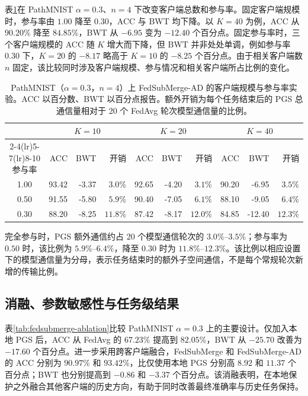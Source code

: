 表\ref{tab:fedsubmerge-scalability}在 PathMNIST $\alpha=0.3$、$n=4$ 下改变客户端总数和参与率。固定客户端规模时，参与率由 $1.00$ 降至 $0.30$，ACC 与 BWT 均下降。以 $K=40$ 为例，ACC 从 $90.20\%$ 降至 $84.85\%$，BWT 从 $-6.95$ 变为 $-12.40$ 个百分点。固定参与率时，三个客户端规模的 ACC 随 $K$ 增大而下降，但 BWT 并非处处单调，例如参与率 $0.30$ 下，$K=20$ 的 $-8.17$ 略高于 $K=10$ 的 $-8.25$ 个百分点。由于相关客户端数 $n$ 固定，该比较同时涉及客户端规模、参与情况和相关客户端所占比例的变化。

\begin{table}[htbp]
\centering
\caption{PathMNIST（$\alpha=0.3$，$n=4$）上 FedSubMerge-AD 的客户端规模与参与率实验。ACC 以百分数、BWT 以百分点报告。额外开销为每个任务结束后的 PGS 总通信量相对于 20 个 FedAvg 轮次模型通信量的比例。}
\label{tab:fedsubmerge-scalability}
\thesistablefont
\setlength{\tabcolsep}{3pt}
\renewcommand{\arraystretch}{1.12}
\begin{tabular}{crrrrrrrrr}
\toprule
& \multicolumn{3}{c}{$K=10$} & \multicolumn{3}{c}{$K=20$} & \multicolumn{3}{c}{$K=40$} \\
\cmidrule(lr){2-4}\cmidrule(lr){5-7}\cmidrule(lr){8-10}
参与率 & ACC & BWT & 开销 & ACC & BWT & 开销 & ACC & BWT & 开销 \\
\midrule
1.00 & 93.42 & -3.37 & $3.0\%$ & 92.65 & -4.20 & $3.1\%$ & 90.20 & -6.95 & $3.5\%$ \\
0.50 & 91.55 & -5.80 & $5.9\%$ & 90.40 & -7.05 & $6.1\%$ & 88.10 & -9.05 & $6.4\%$ \\
0.30 & 88.20 & -8.25 & $11.8\%$ & 87.42 & -8.17 & $12.0\%$ & 84.85 & -12.40 & $12.3\%$ \\
\bottomrule
\end{tabular}%

\end{table}

完全参与时，PGS 额外通信约占 20 个模型通信轮次的 $3.0\%$--$3.5\%$；参与率为 $0.50$ 时，该比例为 $5.9\%$--$6.4\%$，降至 $0.30$ 时为 $11.8\%$--$12.3\%$。该比例以相应设置下的模型通信量为分母，表示任务结束时的额外子空间通信，不是每个常规轮次新增的传输比例。

\subsection{消融、参数敏感性与任务级结果}
\label{subsec:fedsubmerge-ablation}

表\ref{tab:fedsubmerge-ablation}比较 PathMNIST $\alpha=0.3$ 上的主要设计。仅加入本地 PGS 后，ACC 从 FedAvg 的 $67.23\%$ 提高到 $82.05\%$，BWT 从 $-25.70$ 改善为 $-17.60$ 个百分点。进一步采用跨客户端融合，FedSubMerge 和 FedSubMerge-AD 的 ACC 分别为 $90.97\%$ 和 $93.42\%$，比仅使用本地 PGS 分别高 $8.92$ 和 $11.37$ 个百分点；BWT 也分别提高到 $-0.86$ 和 $-3.37$ 个百分点。该消融表明，在本地保护之外融合其他客户端的历史方向，有助于同时改善最终准确率与历史任务保持。

